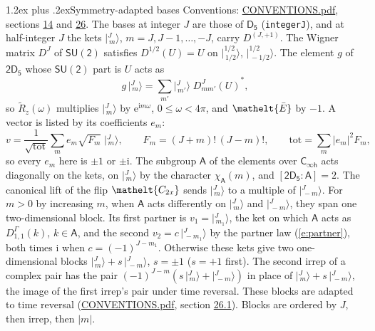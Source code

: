\documentclass[10pt,a4paper]{article}
\makeatletter
\renewcommand\section{\@startsection{section}{1}{\z@}{-3ex plus -1ex minus -.2ex}%
  {1.2ex plus .2ex}{\normalfont\large\sffamily\bfseries\color{parttitle}}}
\numberwithin{equation}{section}
\newcommand{\eltfont}[1]{{\let\sigma\eltsigma\mathelt{#1}}}
\newcommand{\grp}[1]{\mathsf{#1}}
\newcommand{\elt}[1]{\eltfont{#1}}
\newcommand{\grpindex}[2]{[#1 : #2]}
\newcommand{\iunit}{\mathrm{i}}
\newcommand{\expe}{\mathrm{e}}
\newcommand{\irrJp}[2]{D^{(#1,#2)}}
\newcommand{\repD}[1]{D^{#1}}
\newcommand{\wignerD}[1]{D^{#1}}
\newcommand{\chiA}{\chi_{\grp{A}}}
\newcommand{\conj}[1]{{#1}^{*}}
\newcommand{\jm}[2]{\bigl\lvert{}^{#1}_{\,#2}\bigr\rangle}
\newcommand{\barred}[1]{\bar{#1}}
\newcommand{\lift}[1]{\tilde{#1}}
\makeatother
\begin{document}
\section{Symmetry-adapted bases}\label{s:bases}
Conventions: \href{../../CONVENTIONS.pdf}{CONVENTIONS.pdf}, sections \href{../../../rotation/CONVENTIONS.pdf\#conv.14}{14} and \href{../../CONVENTIONS.pdf\#conv.26}{26}.
\leavevmode\label{n:index.m}\label{n:vector.ket}The bases at integer $J$ are those of \href{../../../rotation/data/pdf/D5.pdf}{$\grp{D_{5}}$} (\texttt{integerJ}), and at half-integer $J$ the kets $\jm{J}{m}$, $m = J, J-1, \dots, -J$, carry $\irrJp{J}{+1}$. \label{n:matrix.wigner}The Wigner matrix $\wignerD{J}$ of $\grp{SU(2)}$ satisfies $\wignerD{1/2}(U) = U$ on $\jm{1/2}{1/2}$, $\jm{1/2}{-1/2}$. The element $g$ of $\grp{2D_{5}}$ whose $\grp{SU(2)}$ part is $U$ acts as
\begin{equation}\label{e:action}g\,\jm{J}{m} = \sum_{m'} \jm{J}{m'}\; \conj{\wignerD{J}_{m m'}(U)},\end{equation}
so $\lift{R}_{z}(\omega)$ multiplies $\jm{J}{m}$ by $\expe^{\iunit m\omega}$, $0 \le \omega < 4\pi$, and $\elt{\barred{E}}$ by $-1$. \label{n:index.ketcoefficient}\label{n:vector.basis.symmetry}\label{n:index.ketweight}\label{n:index.total}A vector is listed by its coefficients $e_m$:
\begin{equation}\label{e:ket}v = \frac{1}{\sqrt{\mathrm{tot}}}\sum_m e_m\sqrt{F_m}\;\jm{J}{m},\qquad F_m = (J+m)!\,(J-m)!,\qquad \mathrm{tot} = \sum_m |e_m|^2F_m,\end{equation}
so every $e_m$ here is $\pm 1$ or $\pm\iunit$.
\leavevmode\label{n:group.A}\label{n:function.character.abelian}The subgroup $\grp{A}$ of the elements over $\grp{C_{\infty h}}$ acts diagonally on the kets, on $\jm{J}{m}$ by the character $\chiA(m)$, and $\grpindex{\grp{2D_{5}}}{\grp{A}} = 2$. The canonical lift of the flip $\elt{C_{2x}}$ sends $\jm{J}{m}$ to a multiple of $\jm{J}{-m}$. For $m > 0$ by increasing $m$, when $\grp{A}$ acts differently on $\jm{J}{m}$ and $\jm{J}{-m}$, they span one two-dimensional block. \label{n:index.partner.sign}Its first partner is $v_1 = \jm{J}{m_1}$, the ket on which $\grp{A}$ acts as $\repD{\Gamma}_{1,1}(k)$, $k \in \grp{A}$, and the second $v_2 = c\,\jm{J}{-m_1}$ by the partner law (\ref{e:partner}), both times $\iunit$ when $c = (-1)^{J-m_1}$. \label{n:index.pair.sign}Otherwise these kets give two one-dimensional blocks $\jm{J}{m} + s\,\jm{J}{-m}$, $s = \pm 1$ ($s = +1$ first). The second irrep of a complex pair has the pair $(-1)^{J-m}(s\,\jm{J}{m} + \jm{J}{-m})$ in place of $\jm{J}{m} + s\,\jm{J}{-m}$, the image of the first irrep's pair under time reversal. These blocks are adapted to time reversal (\href{../../CONVENTIONS.pdf}{CONVENTIONS.pdf}, section \href{../../CONVENTIONS.pdf\#conv.26.1}{26.1}). Blocks are ordered by $J$, then irrep, then $|m|$.
\end{document}
